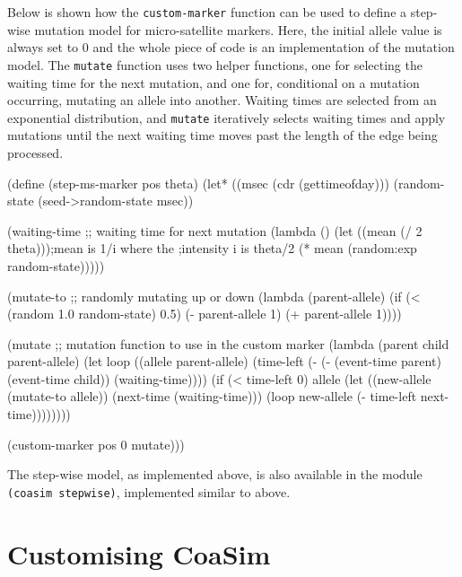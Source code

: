 \documentclass{manual}
\begin{document}
\begin{empfile}
Below is shown how the \texttt{custom-marker} function can be used to
define a step-wise mutation model for micro-satellite markers.  Here,
the initial allele value is always set to 0 and the whole piece of
code is an implementation of the mutation model.  The \texttt{mutate}
function uses two helper functions, one for selecting the waiting time
for the next mutation, and one for, conditional on a mutation
occurring, mutating an allele into another.  Waiting times are
selected from an exponential distribution, and \texttt{mutate}
iteratively selects waiting times and apply mutations until the next
waiting time moves past the length of the edge being processed.

\begin{code}
(define (step-ms-marker pos theta)
  (let* ((msec (cdr (gettimeofday)))
         (random-state (seed->random-state msec))

         (waiting-time
          ;; waiting time for next mutation
          (lambda ()
            (let ((mean (/ 2 theta)));mean is 1/i where the
                                     ;intensity i is theta/2
              (* mean (random:exp random-state)))))

         (mutate-to
          ;; randomly mutating up or down
          (lambda (parent-allele)
            (if (< (random 1.0 random-state) 0.5)
                (- parent-allele 1)
                (+ parent-allele 1))))

         (mutate
          ;; mutation function to use in the custom marker
          (lambda (parent child parent-allele)
            (let loop ((allele parent-allele)
                       (time-left 
                        (- (- (event-time parent) (event-time child))
                           (waiting-time))))
              (if (< time-left 0)
                  allele
                  (let ((new-allele (mutate-to allele))
                        (next-time (waiting-time)))
                    (loop new-allele (- time-left next-time))))))))

    (custom-marker pos 0 mutate)))
\end{code}

The step-wise model, as implemented above, is also available in the
module \texttt{(coasim stepwise)}, implemented similar to above.

\section{Customising CoaSim}
\label{sec:customising-coasim}


\end{empfile}
\end{document}
